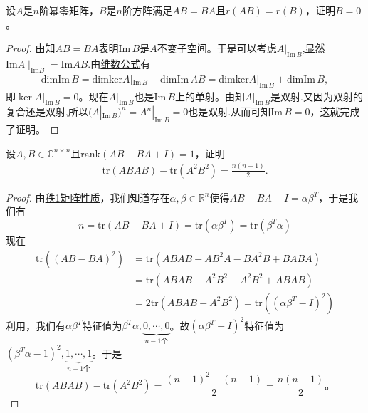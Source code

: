 \documentclass[../../main.tex]{subfiles}%
\begin{document}
\begin{example}
设\( A \)是\( n \)阶幂零矩阵，\( B \)是\( n \)阶方阵满足\( AB = BA \)且\( r(AB) = r(B) \)，证明\( B = 0 \)。
\end{example}
\begin{proof}
由知\( AB = BA \)表明\( \text{Im}\, B \)是\( A \)不变子空间。于是可以考虑\( A|_{\text{Im}\, B} \),显然$\mathrm{Im} A\mid_{\mathrm{Im} B}=\mathrm{Im} AB$.由\hyperref[theorem:交和空间维数公式]{维数公式}有
\begin{align*}
\mathrm{dimIm}\,B=\mathrm{dimker}A|_{\mathrm{Im}\,B}+\mathrm{dimIm}\,AB=\mathrm{dimker}A|_{\mathrm{Im}\,B}+\mathrm{dimIm}\,B,
\end{align*}
即\( \ker A|_{\text{Im}\, B} = 0 \)。现在\( A|_{\text{Im}\, B} \)也是\( \text{Im}\, B \)上的单射。由知\( A|_{\text{Im}\, B} \)是双射.又因为双射的复合还是双射,所以\( (A|_{\text{Im}\, B})^n = A^n|_{\text{Im}\, B} = 0 \)也是双射.从而可知\( \text{Im}\, B = 0 \)，这就完成了证明。
\end{proof}

\begin{example}
设\( A,B \in \mathbb{C}^{n \times n} \)且\( \text{rank}(AB - BA + I) = 1 \)，证明
\begin{align}
\text{tr}(ABAB) - \text{tr}(A^2B^2) = \frac{n(n - 1)}{2}. \label{EQ:::-48972489-----12-1--23.116}
\end{align}
\end{example}
\begin{proof}
由\hyperref[lemma:秩1矩阵的列向量分解]{秩1矩阵性质}，我们知道存在\( \alpha,\beta \in \mathbb{R}^n \)使得\( AB - BA + I = \alpha\beta^T \)，于是我们有
\[
n = \text{tr}(AB - BA + I) = \text{tr}(\alpha\beta^T) = \text{tr}(\beta^T\alpha)
\]
现在
\[
\begin{aligned}
\text{tr}\left((AB - BA)^2\right) &= \text{tr}(ABAB - AB^2A - BA^2B + BABA) \\
&= \text{tr}(ABAB - A^2B^2 - A^2B^2 + ABAB) \\
&= 2\text{tr}(ABAB - A^2B^2) = \text{tr}\left((\alpha\beta^T - I)^2\right)
\end{aligned}
\]
利用，我们有\( \alpha\beta^T \)特征值为\( \beta^T\alpha,\underbrace{0,\cdots,0}_{n-1个} \)。故\( (\alpha\beta^T - I)^2 \)特征值为\( (\beta^T\alpha - 1)^2,\underbrace{1,\cdots,1}_{n-1个} \)。于是
\[
\text{tr}(ABAB) - \text{tr}(A^2B^2) = \frac{(n - 1)^2 + (n - 1)}{2} = \frac{n(n - 1)}{2}。
\]
\end{proof}
\end{document}

